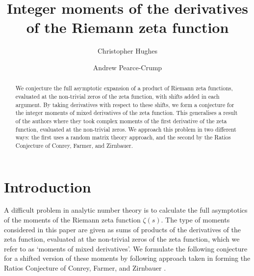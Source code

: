 \documentclass[12pt,a4paper,reqno]{amsart}
\theoremstyle{remark}
\numberwithin{equation}{section}
\begin{document}
\title[Integer moments of the derivatives of zeta]{Integer moments of the derivatives of the Riemann zeta function}



\author{Christopher Hughes}
\address{Department of Mathematics, University of York, York, YO10 5GH, United Kingdom}
\author{Andrew Pearce-Crump}
\address{School of Mathematics, Fry Building, Woodland Road, Bristol, BS8 1UG, United Kingdom}


\begin{abstract}
    We conjecture the full asymptotic expansion of a product of Riemann zeta functions, evaluated at the non-trivial zeros of the zeta function, with shifts added in each argument. By taking derivatives with respect to these shifts, we form a conjecture for the integer moments of mixed derivatives of the zeta function. This generalises a result of the authors where they took complex moments of the first derivative of the zeta function, evaluated at the non-trivial zeros. We approach this problem in two different ways: the first uses a random matrix theory approach, and the second by the Ratios Conjecture of Conrey, Farmer, and Zirnbauer.
\end{abstract}





\maketitle


\section{Introduction}\label{sect:Intro}
A difficult problem in analytic number theory is to calculate the full asymptotics of the moments of the Riemann zeta function $\zeta (s)$. The type of moments considered in this paper are given as sums of products of the derivatives of the zeta function, evaluated at the non-trivial zeros of the zeta function, which we refer to as `moments of mixed derivatives'. We formulate the following conjecture for a shifted version of these moments by following approach taken in forming the Ratios Conjecture of Conrey, Farmer, and Zirnbauer \cite{CFZ05}.
\end{document}

